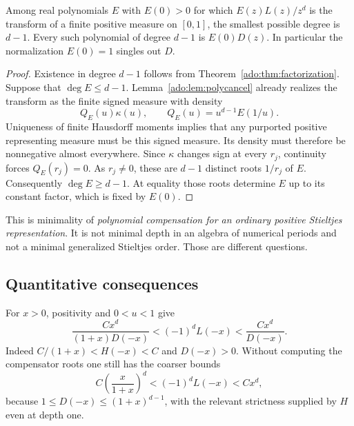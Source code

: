 \begin{theorem}
\label{ado:thm:minimality}
Among real polynomials $E$ with $E(0)>0$ for which $E(z)L(z)/z^d$
is the transform of a finite positive measure on $[0,1]$, the smallest
possible degree is $d-1$. Every such polynomial of degree $d-1$ is
$E(0)D(z)$. In particular the normalization $E(0)=1$ singles out $D$.
\end{theorem}
\begin{proof}
Existence in degree $d-1$ follows from
Theorem~\ref{ado:thm:factorization}. Suppose that $\deg E\le d-1$.
Lemma~\ref{ado:lem:polycancel} already realizes the transform as the
finite signed measure with density
\[
 Q_E(u)\kappa(u),\qquad Q_E(u)=u^{d-1}E(1/u).
\]
Uniqueness of finite Hausdorff moments implies that any purported
positive representing measure must be this signed measure. Its density
must therefore be nonnegative almost everywhere. Since $\kappa$
changes sign at every $r_j$, continuity forces $Q_E(r_j)=0$.
As $r_j\ne0$, these are $d-1$ distinct roots $1/r_j$ of $E$.
Consequently $\deg E\ge d-1$. At equality those roots determine
$E$ up to its constant factor, which is fixed by $E(0)$.
\end{proof}
This is minimality of \emph{polynomial compensation for an ordinary
positive Stieltjes representation}. It is not minimal depth in an
algebra of numerical periods and not a minimal generalized Stieltjes
order. Those are different questions.

\subsection{Quantitative consequences}
For $x>0$, positivity and $0<u<1$ give
\begin{equation}\label{ado:eq:negativebounds}
 \frac{Cx^d}{(1+x)D(-x)}
 <(-1)^dL(-x)<\frac{Cx^d}{D(-x)}.
\end{equation}
Indeed $C/(1+x)<H(-x)<C$ and $D(-x)>0$. Without computing the
compensator roots one still has the coarser bounds
\begin{equation}\label{ado:eq:coarsebounds}
 C\left(\frac{x}{1+x}\right)^d
 <(-1)^dL(-x)<Cx^d,
\end{equation}
because $1\le D(-x)\le(1+x)^{d-1}$, with the relevant strictness
supplied by $H$ even at depth one.

